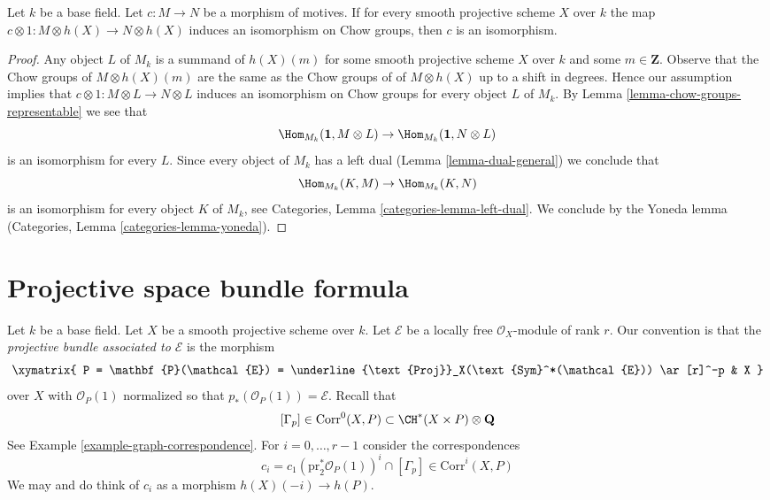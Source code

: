 \begin{lemma}[Manin]
\label{lemma-manin}
Let $k$ be a base field. Let $c : M \to N$ be a morphism of motives.
If for every smooth projective scheme $X$ over $k$ the map
$c \otimes 1 : M \otimes h(X) \to N \otimes h(X)$ induces an isomorphism on
Chow groups, then $c$ is an isomorphism.
\end{lemma}

\begin{proof}
Any object $L$ of $M_k$ is a summand of $h(X)(m)$ for some smooth projective
scheme $X$ over $k$ and some $m \in \mathbf{Z}$. Observe that the Chow groups
of $M \otimes h(X)(m)$ are the same as the Chow groups of of $M \otimes h(X)$
up to a shift in degrees. Hence our assumption implies
that $c \otimes 1 : M \otimes L \to N \otimes L$ induces an isomorphism on
Chow groups for every object $L$ of $M_k$. By
Lemma \ref{lemma-chow-groups-representable}
we see that
$$
\Hom_{M_k}(\mathbf{1}, M \otimes L) \to
\Hom_{M_k}(\mathbf{1}, N \otimes L)
$$
is an isomorphism for every $L$. Since every object of $M_k$ has a left dual
(Lemma \ref{lemma-dual-general}) we conclude that
$$
\Hom_{M_k}(K, M) \to \Hom_{M_k}(K, N)
$$
is an isomorphism for every object $K$ of $M_k$, see
Categories, Lemma \ref{categories-lemma-left-dual}.
We conclude by the Yoneda lemma
(Categories, Lemma \ref{categories-lemma-yoneda}).
\end{proof}




\section{Projective space bundle formula}
\label{section-projective-space-bundle}

\noindent
Let $k$ be a base field. Let $X$ be a smooth projective scheme over $k$.
Let $\mathcal{E}$ be a locally free $\mathcal{O}_X$-module of rank $r$.
Our convention is that the {\it projective bundle associated to
$\mathcal{E}$} is the morphism
$$
\xymatrix{
P = \mathbf{P}(\mathcal{E}) =
\underline{\text{Proj}}_X(\text{Sym}^*(\mathcal{E}))
\ar[r]^-p
& X
}
$$
over $X$ with $\mathcal{O}_P(1)$ normalized so that
$p_*(\mathcal{O}_P(1)) = \mathcal{E}$. Recall that
$$
[\Gamma_p] \in \text{Corr}^0(X, P) \subset \CH^*(X \times P) \otimes \mathbf{Q}
$$
See Example \ref{example-graph-correspondence}.
For $i = 0, \ldots, r - 1$ consider the correspondences
$$
c_i = c_1(\text{pr}_2^*\mathcal{O}_P(1))^i \cap [\Gamma_p]
\in \text{Corr}^i(X, P)
$$
We may and do think of $c_i$ as a morphism $h(X)(-i) \to h(P)$.

